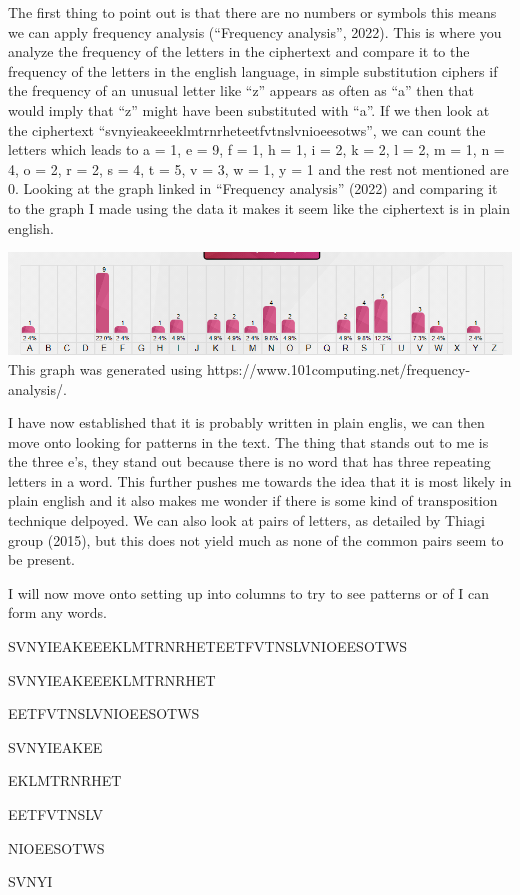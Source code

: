 \documentclass[11pt]{article}
\begin{document}
    The first thing to point out is that there are no numbers or symbols
this means we can apply frequency analysis (``Frequency analysis'',
2022). This is where you analyze the frequency of the letters in the
ciphertext and compare it to the frequency of the letters in the english
language, in simple substitution ciphers if the frequency of an unusual
letter like ``z'' appears as often as ``a'' then that would imply that
``z'' might have been substituted with ``a''. If we then look at the
ciphertext ``svnyieakeeeklmtrnrheteetfvtnslvnioeesotws'', we can count
the letters which leads to a = 1, e = 9, f = 1, h = 1, i = 2, k = 2, l =
2, m = 1, n = 4, o = 2, r = 2, s = 4, t = 5, v = 3, w = 1, y = 1 and the
rest not mentioned are 0. Looking at the graph linked in ``Frequency
analysis'' (2022) and comparing it to the graph I made using the data it
makes it seem like the ciphertext is in plain english.

\includegraphics{graph.png} This graph was generated using
https://www.101computing.net/frequency-analysis/.

I have now established that it is probably written in plain englis, we
can then move onto looking for patterns in the text. The thing that
stands out to me is the three e's, they stand out because there is no
word that has three repeating letters in a word. This further pushes me
towards the idea that it is most likely in plain english and it also
makes me wonder if there is some kind of transposition technique
delpoyed. We can also look at pairs of letters, as detailed by Thiagi
group (2015), but this does not yield much as none of the common pairs
seem to be present.

I will now move onto setting up into columns to try to see patterns or
of I can form any words.

SVNYIEAKEEEKLMTRNRHETEETFVTNSLVNIOEESOTWS

SVNYIEAKEEEKLMTRNRHET

EETFVTNSLVNIOEESOTWS

SVNYIEAKEE

EKLMTRNRHET

EETFVTNSLV

NIOEESOTWS

SVNYI
\end{document}
